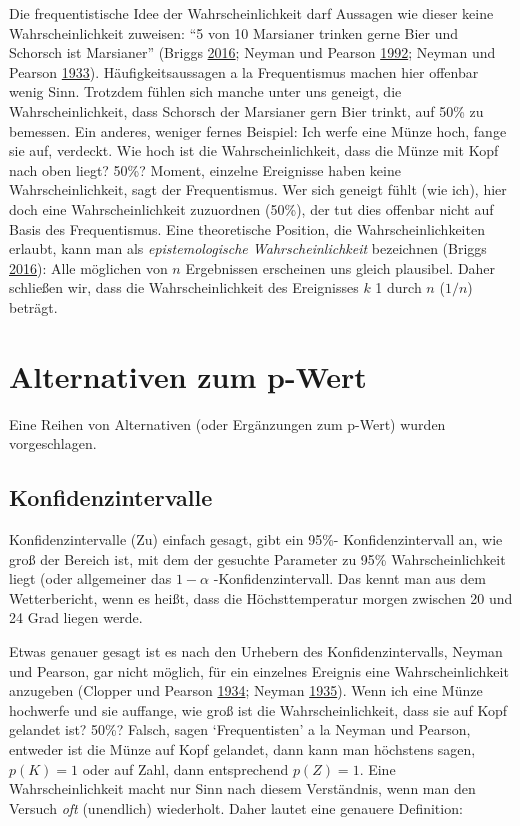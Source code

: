 \documentclass[12pt,ngerman,]{book}
\theoremstyle{definition}
\theoremstyle{definition}
\theoremstyle{remark}
\begin{document}
Die frequentistische Idee der Wahrscheinlichkeit darf Aussagen wie
dieser keine Wahrscheinlichkeit zuweisen: ``5 von 10 Marsianer trinken
gerne Bier und Schorsch ist Marsianer'' (Briggs
\protect\hyperlink{ref-uncertainty}{2016}; Neyman und Pearson
\protect\hyperlink{ref-neyman1992problem}{1992}; Neyman und Pearson
\protect\hyperlink{ref-Neyman1933}{1933}). Häufigkeitsaussagen a la
Frequentismus machen hier offenbar wenig Sinn. Trotzdem fühlen sich
manche unter uns geneigt, die Wahrscheinlichkeit, dass Schorsch der
Marsianer gern Bier trinkt, auf 50\% zu bemessen. Ein anderes, weniger
fernes Beispiel: Ich werfe eine Münze hoch, fange sie auf, verdeckt. Wie
hoch ist die Wahrscheinlichkeit, dass die Münze mit Kopf nach oben
liegt? 50\%? Moment, einzelne Ereignisse haben keine Wahrscheinlichkeit,
sagt der Frequentismus. Wer sich geneigt fühlt (wie ich), hier doch eine
Wahrscheinlichkeit zuzuordnen (50\%), der tut dies offenbar nicht auf
Basis des Frequentismus. Eine theoretische Position, die
Wahrscheinlichkeiten erlaubt, kann man als \emph{epistemologische
Wahrscheinlichkeit} bezeichnen (Briggs
\protect\hyperlink{ref-uncertainty}{2016}): Alle möglichen von \(n\)
Ergebnissen erscheinen uns gleich plausibel. Daher schließen wir, dass
die Wahrscheinlichkeit des Ereignisses \(k\) 1 durch \(n\) (\(1/n\))
beträgt.

\section{Alternativen zum p-Wert}\label{alternativen-zum-p-wert}

Eine Reihen von Alternativen (oder Ergänzungen zum p-Wert) wurden
vorgeschlagen.

\subsection{Konfidenzintervalle}\label{konfidenzintervalle}

Konfidenzintervalle (Zu) einfach gesagt, gibt
ein 95\%- Konfidenzintervall an, wie groß der Bereich ist, mit dem der
gesuchte Parameter zu 95\% Wahrscheinlichkeit liegt (oder allgemeiner
das \(1-\alpha\) -Konfidenzintervall. Das kennt man aus dem
Wetterbericht, wenn es heißt, dass die Höchsttemperatur morgen zwischen
20 und 24 Grad liegen werde.

Etwas genauer gesagt ist es nach den Urhebern des Konfidenzintervalls,
Neyman und Pearson, gar nicht möglich, für ein einzelnes Ereignis eine
Wahrscheinlichkeit anzugeben (Clopper und Pearson
\protect\hyperlink{ref-clopper1934use}{1934}; Neyman
\protect\hyperlink{ref-neyman1935problem}{1935}). Wenn ich eine Münze
hochwerfe und sie auffange, wie groß ist die Wahrscheinlichkeit, dass
sie auf Kopf gelandet ist? 50\%? Falsch, sagen `Frequentisten' a la
Neyman und Pearson, entweder ist die Münze auf Kopf gelandet, dann kann
man höchstens sagen, \(p(K)=1\) oder auf Zahl, dann entsprechend
\(p(Z)=1\). Eine Wahrscheinlichkeit macht nur Sinn nach diesem
Verständnis, wenn man den Versuch \emph{oft} (unendlich) wiederholt.
Daher lautet eine genauere Definition:
\end{document}
